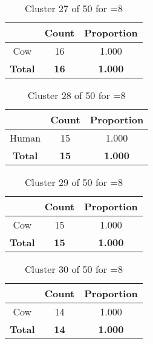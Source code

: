 \begin{table}[ht!]
\centering
\begin{tabular}{|c|c|c|}
\hline
\bf \Spec{} &\bf Count &\bf Proportion\\ \hline \hline
Cow & 16 & 1.000\\ \hline
\hline
\bf Total & \bf 16 & \bf 1.000\\ \hline
\end{tabular}
\label{tab:cluster:27:8}
\caption{Cluster 27 of 50 for \minneigh{}=8}
\end{table}

\begin{table}[ht!]
\centering
\begin{tabular}{|c|c|c|}
\hline
\bf \Spec{} &\bf Count &\bf Proportion\\ \hline \hline
Human & 15 & 1.000\\ \hline
\hline
\bf Total & \bf 15 & \bf 1.000\\ \hline
\end{tabular}
\label{tab:cluster:28:8}
\caption{Cluster 28 of 50 for \minneigh{}=8}
\end{table}

\begin{table}[ht!]
\centering
\begin{tabular}{|c|c|c|}
\hline
\bf \Spec{} &\bf Count &\bf Proportion\\ \hline \hline
Cow & 15 & 1.000\\ \hline
\hline
\bf Total & \bf 15 & \bf 1.000\\ \hline
\end{tabular}
\label{tab:cluster:29:8}
\caption{Cluster 29 of 50 for \minneigh{}=8}
\end{table}

\clearpage
\begin{table}[ht!]
\centering
\begin{tabular}{|c|c|c|}
\hline
\bf \Spec{} &\bf Count &\bf Proportion\\ \hline \hline
Cow & 14 & 1.000\\ \hline
\hline
\bf Total & \bf 14 & \bf 1.000\\ \hline
\end{tabular}
\label{tab:cluster:30:8}
\caption{Cluster 30 of 50 for \minneigh{}=8}
\end{table}


